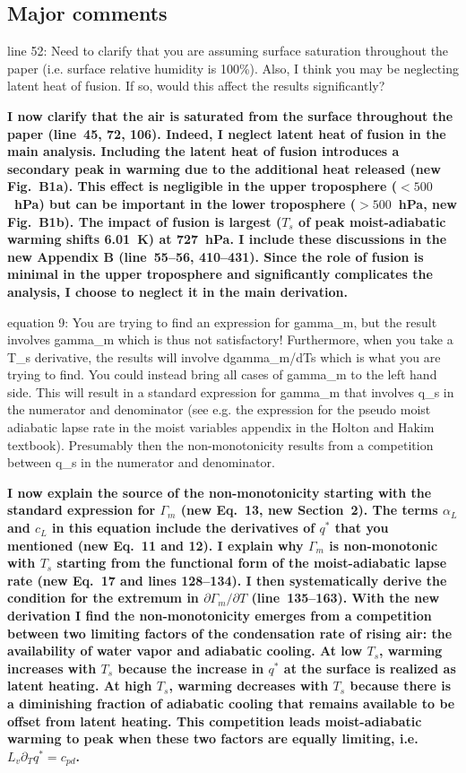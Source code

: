 \documentclass{article}
\begin{document}
\subsection*{Major comments}
line 52: Need to clarify that you are assuming surface saturation throughout the paper (i.e. surface relative humidity is 100\%). Also, I think you may be neglecting latent heat of fusion. If so, would this affect the results significantly?
\par
\textbf{I now clarify that the air is saturated from the surface throughout the paper (line~45, 72, 106). Indeed, I neglect latent heat of fusion in the main analysis. Including the latent heat of fusion introduces a secondary peak in warming due to the additional heat released (new Fig.~B1a). This effect is negligible in the upper troposphere ($<500$~hPa) but can be important in the lower troposphere ($>500$~hPa, new Fig.~B1b). The impact of fusion is largest ($T_s$ of peak moist-adiabatic warming shifts 6.01~K) at 727~hPa. I include these discussions in the new Appendix B (line~55--56, 410--431). Since the role of fusion is minimal in the upper troposphere and significantly complicates the analysis, I choose to neglect it in the main derivation.}
\par
equation 9: You are trying to find an expression for gamma\_m, but the result involves gamma\_m which is thus not satisfactory! Furthermore, when you take a T\_s derivative, the results will involve dgamma\_m/dTs which is what you are trying to find. You could instead bring all cases of gamma\_m to the left hand side. This will result in a standard expression for gamma\_m that involves q\_s in the numerator and denominator (see e.g. the expression for the pseudo moist adiabatic lapse rate in the moist variables appendix in the Holton and Hakim textbook). Presumably then the non-monotonicity results from a competition between q\_s in the numerator and denominator.
\par
\textbf{I now explain the source of the non-monotonicity starting with the standard expression for $\Gamma_m$ (new Eq.~13, new Section~2). The terms $\alpha_L$ and $c_L$ in this equation include the derivatives of $q^*$ that you mentioned (new Eq.~11 and 12). I explain why $\Gamma_m$ is non-monotonic with $T_s$ starting from the functional form of the moist-adiabatic lapse rate (new Eq.~17 and lines 128--134). I then systematically derive the condition for the extremum in $\partial\Gamma_m/\partial T$ (line~135--163). With the new derivation I find the non-monotonicity emerges from a competition between two limiting factors of the condensation rate of rising air: the availability of water vapor and adiabatic cooling. At low $T_s$, warming increases with $T_s$ because the increase in $q^*$ at the surface is realized as latent heating. At high $T_s$, warming decreases with $T_s$ because there is a diminishing fraction of adiabatic cooling that remains available to be offset from latent heating. This competition leads moist-adiabatic warming to peak when these two factors are equally limiting, i.e. $L_v \partial_T q^* = c_{pd}$.}
\end{document}
